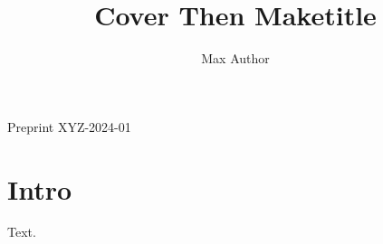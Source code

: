 \documentclass{article}
\title{Cover Then Maketitle}
\author{Max Author}
\begin{document}
\begin{center}{\Huge \@title\par}\end{center}
\begin{flushright}Preprint XYZ-2024-01\end{flushright}
\maketitle
\section{Intro}
Text.
\end{document}
